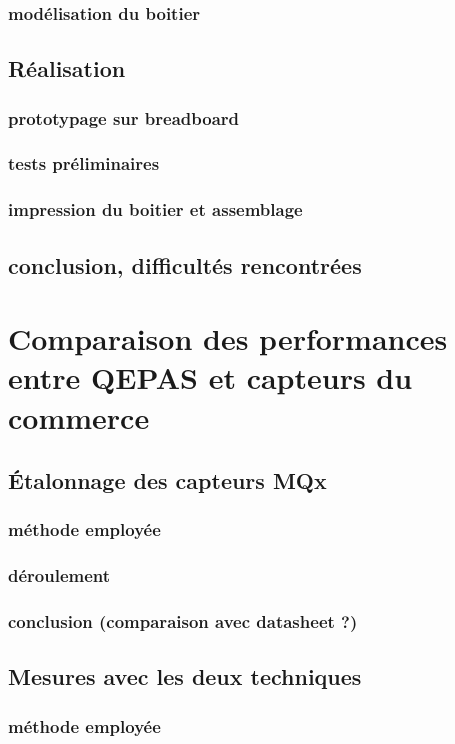 \documentclass[a4paper]{report}
\begin{document}
	\subsection{modélisation du boitier}
	
	\section{Réalisation}
	\subsection{prototypage sur breadboard}
	\subsection{tests préliminaires}
	\subsection{impression du boitier et assemblage}
	
	\section{conclusion, difficultés rencontrées}

	\chapter{Comparaison des performances entre QEPAS et capteurs du commerce}
	\section{Étalonnage des capteurs MQx}
	\subsection{méthode employée}
	\subsection{déroulement}
	\subsection{conclusion (comparaison avec datasheet ?)}
	
	\section{Mesures avec les deux techniques}
	\subsection{méthode employée}
\end{document}

